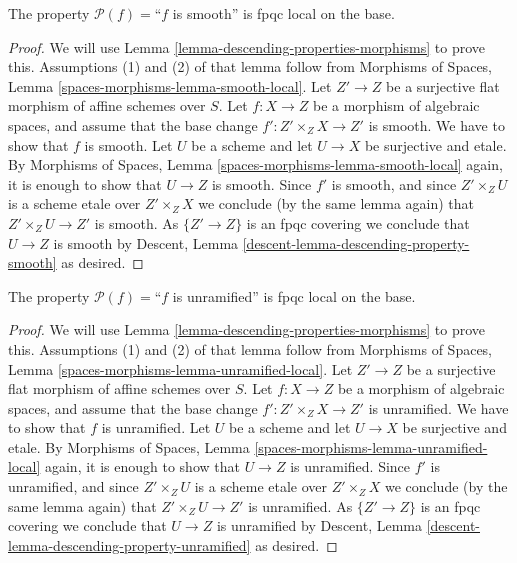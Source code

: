 \begin{lemma}
\label{lemma-descending-property-smooth}
The property $\mathcal{P}(f) =$``$f$ is smooth''
is fpqc local on the base.
\end{lemma}

\begin{proof}
We will use
Lemma \ref{lemma-descending-properties-morphisms}
to prove this. Assumptions (1) and (2) of that lemma follow from
Morphisms of Spaces,
Lemma \ref{spaces-morphisms-lemma-smooth-local}.
Let $Z' \to Z$ be a surjective flat morphism of affine schemes over $S$.
Let $f : X \to Z$ be a morphism of algebraic spaces, and assume
that the base change $f' : Z' \times_Z X \to Z'$ is smooth.
We have to show that $f$ is smooth. Let $U$ be a scheme
and let $U \to X$ be surjective and etale. By
Morphisms of Spaces,
Lemma \ref{spaces-morphisms-lemma-smooth-local}
again, it is enough to show that $U \to Z$ is smooth.
Since $f'$ is smooth, and since $Z' \times_Z U$ is a
scheme etale over $Z' \times_Z X$ we conclude (by the same lemma again) that
$Z' \times_Z U \to Z'$ is smooth.
As $\{Z' \to Z\}$ is an fpqc covering we conclude that
$U \to Z$ is smooth by
Descent, Lemma \ref{descent-lemma-descending-property-smooth}
as desired.
\end{proof}

\begin{lemma}
\label{lemma-descending-property-unramified}
The property $\mathcal{P}(f) =$``$f$ is unramified''
is fpqc local on the base.
\end{lemma}

\begin{proof}
We will use
Lemma \ref{lemma-descending-properties-morphisms}
to prove this. Assumptions (1) and (2) of that lemma follow from
Morphisms of Spaces,
Lemma \ref{spaces-morphisms-lemma-unramified-local}.
Let $Z' \to Z$ be a surjective flat morphism of affine schemes over $S$.
Let $f : X \to Z$ be a morphism of algebraic spaces, and assume
that the base change $f' : Z' \times_Z X \to Z'$ is unramified.
We have to show that $f$ is unramified. Let $U$ be a scheme
and let $U \to X$ be surjective and etale. By
Morphisms of Spaces,
Lemma \ref{spaces-morphisms-lemma-unramified-local}
again, it is enough to show that $U \to Z$ is unramified.
Since $f'$ is unramified, and since $Z' \times_Z U$ is a
scheme etale over $Z' \times_Z X$ we conclude (by the same lemma again) that
$Z' \times_Z U \to Z'$ is unramified.
As $\{Z' \to Z\}$ is an fpqc covering we conclude that
$U \to Z$ is unramified by
Descent, Lemma \ref{descent-lemma-descending-property-unramified}
as desired.
\end{proof}

